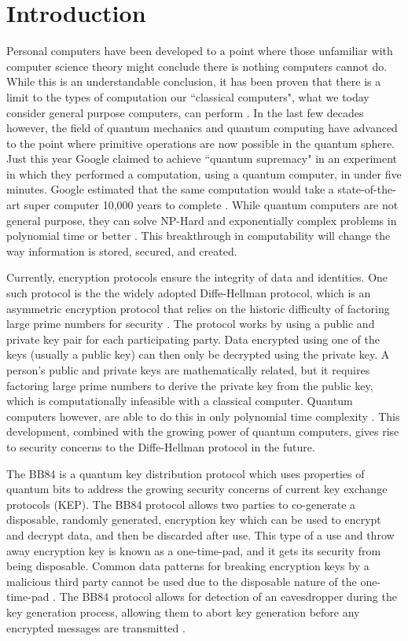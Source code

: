 \chapter{Introduction}
\label{chap:introduction}

Personal computers have been developed to a point where those unfamiliar with computer science theory might conclude there is nothing computers cannot do.
While this is an understandable conclusion, it has been proven that there is a limit to the types of computation our ``classical computers", what we today consider general purpose computers, can perform \cite{linz}.
In the last few decades however, the field of quantum mechanics and quantum computing have advanced to the point where primitive operations are now possible in the quantum sphere.
Just this year Google claimed to achieve ``quantum supremacy" in an experiment in which they performed a computation, using a quantum computer, in under five minutes. 
Google estimated that the same computation would take a state-of-the-art super computer 10,000 years to complete \cite{quantum_supremacy}. 
While quantum computers are not general purpose, they can solve NP-Hard and exponentially complex problems in polynomial time or better \cite{MikeAndIke}.
This breakthrough in computability will change the way information is stored, secured, and created.

Currently, encryption protocols ensure the integrity of data and identities.
One such protocol is the the widely adopted Diffe-Hellman protocol, which is an asymmetric encryption protocol that relies on the historic difficulty of factoring large prime numbers for security \cite{qc:agi}.
The protocol works by using a public and private key pair for each participating party.
Data encrypted using one of the keys (usually a public key) can then only be decrypted using the private key.
A person's public and private keys are mathematically related, but it requires factoring large prime numbers to derive the private key from the public key, which is computationally infeasible with a classical computer.
Quantum computers however, are able to do this in only polynomial time complexity \cite{doi:10.1137/S0036144598347011}.
This development, combined with the growing power of quantum computers, gives rise to security concerns to the Diffe-Hellman protocol in the future.

The BB84 is a quantum key distribution protocol which uses properties of quantum bits to address the growing security concerns of current key exchange protocols (KEP).
The BB84 protocol allows two parties to co-generate a disposable, randomly generated, encryption key which can be used to encrypt and decrypt data, and then be discarded after use.
This type of a use and throw away encryption key is known as a one-time-pad, and it gets its security from being disposable.
Common data patterns for breaking encryption keys by a malicious third party cannot be used due to the disposable nature of the one-time-pad \cite{cryptography}.
The BB84 protocol allows for detection of an eavesdropper during the key generation process, allowing them to abort key generation before any encrypted messages are transmitted \cite{qcftgu}.

